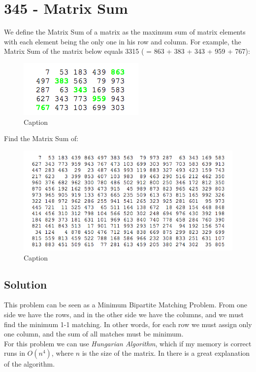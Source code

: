 \chapter*{345 - Matrix Sum}

We define the Matrix Sum of a matrix as the maximum sum of matrix elements with each element being the only one in his row and column. For example, the Matrix Sum of the matrix below equals 3315 ( = 863 + 383 + 343 + 959 + 767):

\begin{figure}[H]
    \centering
    \includegraphics[scale=0.5]{images/pe345a.png}
    \caption{Caption}
    \label{fig:pe345a}
\end{figure}


Find the Matrix Sum of:

\begin{figure}[H]
    \centering
    \includegraphics[scale=0.5]{images/pe345b.png}
    \caption{Caption}
    \label{fig:pe345b}
\end{figure}


\section*{Solution}

This problem can be seen as a Minimum Bipartite Matching Problem. From one side we have the rows, and in the other side we have the columns, and we must find the minimum 1-1 matching. In other words, for each row we must assign only one column, and the sum of all matches must be minimum.\\

For this problem we can use \textit{Hungarian Algorithm}, which if my memory is correct runs in $O(n^4)$, where $n$ is the size of the matrix. In \cite{hungarian} there is a great explanation of the algorithm.

